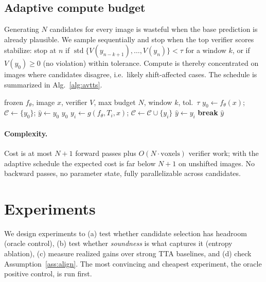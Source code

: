 \documentclass[10pt]{article}
\begin{document}
\subsection{Adaptive compute budget}
Generating $N$ candidates for every image is wasteful when the base prediction is already plausible. We sample sequentially and stop when the top verifier scores stabilize: stop at $n$ if $\operatorname{std}\{V(y_{n-k+1}),\dots,V(y_n)\}<\tau$ for a window $k$, or if $V(y_0)\ge 0$ (no violation) within tolerance. Compute is thereby concentrated on images where candidates disagree, i.e.\ likely shift-affected cases. The schedule is summarized in Alg.~\ref{alg:avtts}.

\begin{algorithm}[t]
\caption{AV-TTS (select-best with adaptive budget)}\label{alg:avtts}
\begin{algorithmic}[1]
\Require frozen $f_\theta$, image $x$, verifier $V$, max budget $N$, window $k$, tol.\ $\tau$
\State $y_0 \gets f_\theta(x)$; \quad $\mathcal{C}\gets\{y_0\}$; \quad $\hat y \gets y_0$
 \Return $y_0$  \EndIf
{}
  \State $y_i \gets g(f_\theta, T_i, x)$; \quad $\mathcal{C}\gets\mathcal{C}\cup\{y_i\}$
   $\hat y \gets y_i$ \EndIf
   \textbf{break} \EndIf
\EndFor
\State \Return $\hat y$ 
\end{algorithmic}
\end{algorithm}

\paragraph{Complexity.} Cost is at most $N{+}1$ forward passes plus $O(N\cdot\text{voxels})$ verifier work; with the adaptive schedule the expected cost is far below $N{+}1$ on unshifted images. No backward passes, no parameter state, fully parallelizable across candidates.

\section{Experiments}\label{sec:exp}
We design experiments to (a) test whether candidate selection has headroom (oracle control), (b) test whether \emph{soundness} is what captures it (entropy ablation), (c) measure realized gains over strong TTA baselines, and (d) check Assumption~\ref{ass:align}. The most convincing and cheapest experiment, the oracle positive control, is run first.
\end{document}
